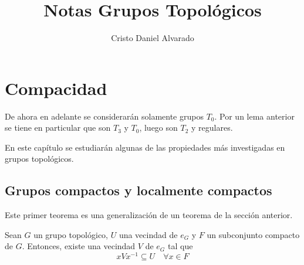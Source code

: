 \documentclass[12pt]{report}
\theoremstyle{largebreak}
\begin{document}
    \setlength{\parskip}{5pt} %
    \setlength{\parindent}{12pt} %
    \title{Notas Grupos Topológicos}
    \author{Cristo Daniel Alvarado}
    \maketitle

    \tableofcontents %

    \setcounter{chapter}{1} %
    
    \chapter{Compacidad}

    \begin{obs}
        De ahora en adelante se considerarán solamente grupos $T_0$. Por un lema anterior se tiene en particular que son $T_3$ y $T_0$, luego son $T_2$ y regulares.
    \end{obs}

    En este capítulo se estudiarán algunas de las propiedades más investigadas en grupos topológicos.

    \section{Grupos compactos y localmente compactos}

    Este primer teorema es una generalización de un teorema de la sección anterior.

    \begin{theor}
        Sean $G$ un grupo topológico, $U$ una vecindad de $e_G$ y $F$ un subconjunto compacto de $G$. Entonces, existe una vecindad $V$ de $e_G$ tal que
        \begin{equation*}
            xVx^{-1}\subseteq U\quad\forall x\in F
        \end{equation*}
    \end{theor}
\end{document}
